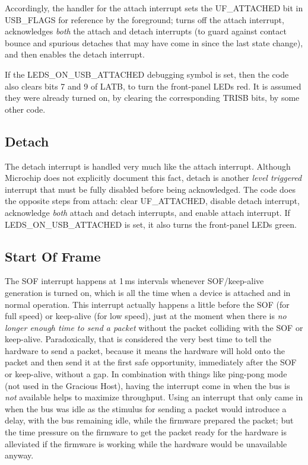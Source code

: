 Accordingly, the handler for the attach interrupt sets the UF\_ATTACHED bit
in USB\_FLAGS for reference by the foreground; turns off the attach
interrupt, acknowledges \emph{both} the attach and detach interrupts (to
guard against contact bounce and spurious detaches that may have come in
since the last state change), and then enables the detach interrupt.

If the LEDS\_ON\_USB\_ATTACHED debugging symbol is set, then the code also
clears bits 7 and 9 of LATB, to turn the front-panel LEDs red.  It is
assumed they were already turned on, by clearing the corresponding TRISB
bits, by some other code.

\subsection{Detach}

The detach interrupt is handled very much like the attach interrupt. 
Although Microchip does not explicitly document this fact, detach is another
\emph{level triggered} interrupt that must be fully disabled before being
acknowledged.  The code does the opposite steps from attach:  clear
UF\_ATTACHED, disable detach interrupt, acknowledge \emph{both} attach and
detach interrupts, and enable attach interrupt.  If LEDS\_ON\_USB\_ATTACHED
is set, it also turns the front-panel LEDs green.

\subsection{Start Of Frame}

The SOF interrupt happens at 1\,ms intervals whenever SOF/keep-alive
generation is turned on, which is all the time when a device is attached and
in normal operation.  This interrupt actually happens a little before the
SOF (for full speed) or keep-alive (for low speed), just at the moment when
there is \emph{no longer enough time to send a packet} without the packet
colliding with the SOF or keep-alive.  Paradoxically, that is considered the
very best time to tell the hardware to send a packet, because it means the
hardware will hold onto the packet and then send it at the first safe
opportunity, immediately after the SOF or keep-alive, without a gap.  In
combination with things like ping-pong mode (not used in the Gracious Host),
having the interrupt come in when the bus is \emph{not} available helps to
maximize throughput.  Using an interrupt that only came in when the bus was
idle as the stimulus for sending a packet would introduce a delay, with the
bus remaining idle, while the firmware prepared the packet; but the time
pressure on the firmware to get the packet ready for the hardware is
alleviated if the firmware is working while the hardware would be
unavailable anyway.

